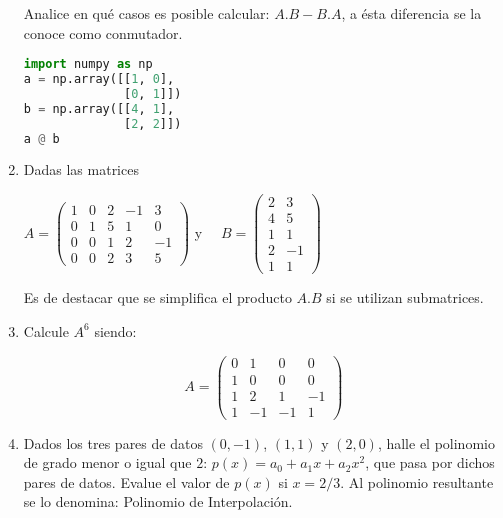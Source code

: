 \begin{enumerate}
 Analice en qué casos es posible calcular:  $A.B-B.A$, a ésta diferencia se la conoce como conmutador.
 \begin{lstlisting}[language = python, numbers = none, escapechar = !,
    basicstyle = \ttfamily\bfseries, linewidth = 1\linewidth] 
import numpy as np
a = np.array([[1, 0],
              [0, 1]])
b = np.array([[4, 1],
              [2, 2]])
a @ b
\end{lstlisting}

 
 \item
 
 Dadas las matrices
 
$A= \left(\begin{array}{ccccc}1 & 0 & 2 & -1  & 3   \\ 0 & 1 & 5 & 1 & 0 \\ 0 & 0 & 1 & 2 & -1 \\ 0 & 0 & 2 & 3 & 5
\end{array}
 \right)$ y ~~$B=\left(\begin{array}{cc}2 & 3 \\ 4 & 5 \\ 1 & 1 \\ 2 & -1 \\ 1 & 1
\end{array}
 \right)$

 \bigskip
 
 Es de destacar que se simplifica el producto $A.B$ si se utilizan submatrices.

 \bigskip
 
 \item
 
 Calcule $A^6$ siendo:
 
 \[A= \left(\begin{array}{cccc}0 & 1 & 0 & 0 \\ 1 & 0 & 0 & 0\\ 1 & 2 & 1 & -1 \\ 1 & -1 & -1 & 1
\end{array}
 \right)
 \]

 \bigskip
 
\item

Dados los tres pares de datos $(0,-1)$, $(1,1)$ y $(2,0)$, halle el polinomio de grado menor o igual que $2$: 
$p(x)= a_0 + a_1x + a_2x^2$, que pasa por dichos pares de datos. Evalue el valor
de $p(x)$ si $x=2/3$. Al polinomio resultante se lo denomina: Polinomio de Interpolación.

\bigskip


\end{enumerate}
